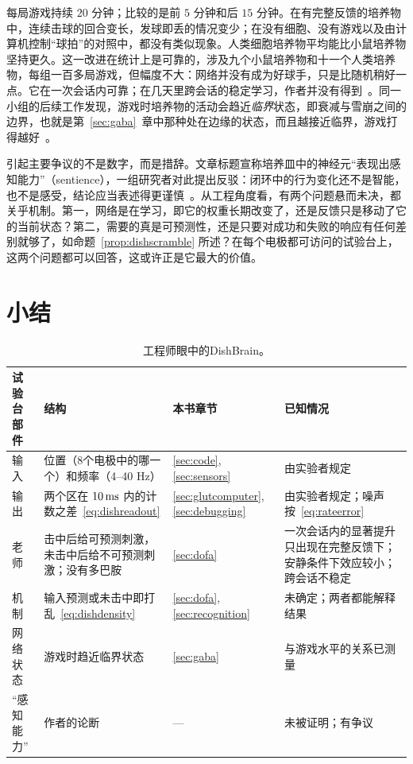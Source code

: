 每局游戏持续 $20$ 分钟；比较的是前 $5$ 分钟和后 $15$ 分钟。在有完整反馈的培养物中，连续击球的回合变长，发球即丢的情况变少；在没有细胞、没有游戏以及由计算机控制“球拍”的对照中，都没有类似现象。人类细胞培养物平均能比小鼠培养物坚持更久。这一改进在统计上是可靠的，涉及九个小鼠培养物和十一个人类培养物，每组一百多局游戏，但幅度不大：网络并没有成为好球手，只是比随机稍好一点。它在一次会话内可靠；在几天里跨会话的稳定学习，作者并没有得到~\cite{Kagan2022}。同一小组的后续工作发现，游戏时培养物的活动会趋近\emph{临界}状态，即衰减与雪崩之间的边界，也就是第~\ref{sec:gaba}~章中那种处在边缘的状态，而且越接近临界，游戏打得越好~\cite{Habibollahi2023}。

引起主要争议的不是数字，而是措辞。文章标题宣称培养皿中的神经元“表现出感知能力”（sentience），一组研究者对此提出反驳：闭环中的行为变化还不是智能，也不是感受，结论应当表述得更谨慎~\cite{Balci2023}。从工程角度看，有两个问题悬而未决，都关乎机制。第一，网络是在学习，即它的权重长期改变了，还是反馈只是移动了它的当前状态？第二，需要的真是可预测性，还是只要对成功和失败的响应有任何差别就够了，如命题~\ref{prop:dishscramble} 所述？在每个电极都可访问的试验台上，这两个问题都可以回答，这或许正是它最大的价值。



\section{小结}

\begin{table}[t]
\centering
\footnotesize
\setlength{\tabcolsep}{4pt}
\renewcommand{\arraystretch}{1.15}
\begin{tabular}{>{\raggedright}p{2.1cm}>{\raggedright}p{4.2cm}>{\raggedright}p{1.9cm}>{\raggedright\arraybackslash}p{4.6cm}}
\toprule
试验台部件 & 结构 & 本书章节 & 已知情况 \\
\midrule
输入 & 位置（8个电极中的哪一个）和频率（4--40 Hz） & \ref{sec:code}, \ref{sec:sensors} & 由实验者规定 \\
输出 & 两个区在 $10\,\text{ms}$ 内的计数之差~\eqref{eq:dishreadout} & \ref{sec:glutcomputer}, \ref{sec:debugging} & 由实验者规定；噪声按~\eqref{eq:rateerror} \\
老师 & 击中后给可预测刺激，未击中后给不可预测刺激；没有多巴胺 & \ref{sec:dofa} & 一次会话内的显著提升只出现在完整反馈下；安静条件下效应较小；跨会话不稳定 \\
机制 & 输入预测或未击中即打乱~\eqref{eq:dishdensity} & \ref{sec:dofa}, \ref{sec:recognition} & 未确定；两者都能解释结果 \\
网络状态 & 游戏时趋近临界状态 & \ref{sec:gaba} & 与游戏水平的关系已测量 \\
“感知能力” & 作者的论断 & --- & 未被证明；有争议 \\
\bottomrule
\end{tabular}
\caption{工程师眼中的DishBrain。}
\label{tab:dishbrain}
\end{table}

